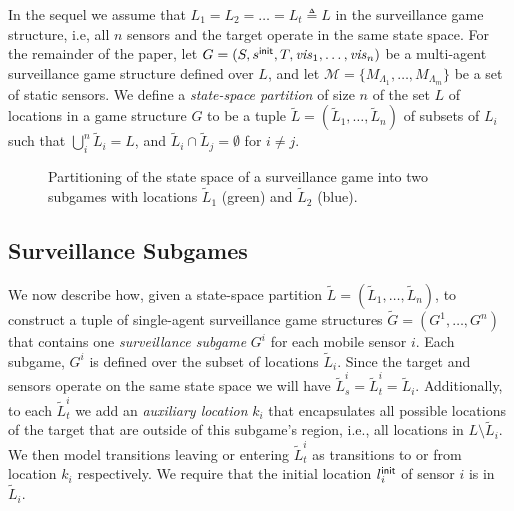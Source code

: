 In the sequel we assume that $L_1 = L_2 = \dots = L_t \triangleq L$  in the surveillance game structure, i.e, all $n$ sensors and the target operate in the same state space. For the remainder of the paper, let $G=(S,s^{\mathsf{init}},T,\mathit{vis}_1,\ldots,\mathit{vis}_n)$ be a multi-agent surveillance game structure  defined over  $L$, and let $\mathcal M = \{M_{\Lambda_1},\dots,M_{\Lambda_m}\}$ be a set of static sensors. We define a  \emph{state-space partition} of size $n$ of the set $L$ of locations in a game structure $G$ to be a tuple $\widetilde L =  (\widetilde L_1,\ldots,\widetilde L_n)$ of subsets of $L_i$ such that  $\bigcup_i^n \widetilde L_i = L $, and $\widetilde L_i \cap \widetilde L_j  = \emptyset$ for $i \neq j$. 


\begin{figure}
{}
\hspace{0.2cm}

\caption{Partitioning of the state space of a surveillance game into two subgames with locations $\widetilde{L}_1$ (green) and $\widetilde{L}_2$ (blue). }
\label{fig:simple-dist-game}
\vspace{-0.6cm}
\end{figure}

\subsection{Surveillance Subgames}
We now describe how, given a state-space partition $\widetilde L =  (\widetilde L_1,\ldots,\widetilde L_n)$, to construct a tuple of single-agent surveillance game structures $\widetilde G = (G^1,\ldots,G^n)$ that contains one  \emph{surveillance subgame} $G^i$ for each mobile sensor  $i$. Each subgame, $G^i$ is defined over the subset of locations $\widetilde{L}_i$. Since the target and sensors operate on the same state space we will have $\widetilde{L}^i_s = \widetilde{L}^i_t = \widetilde{L}_i$. Additionally, to each $\widetilde{L}^i_t$ we add an \emph{auxiliary location} $k_i$ that encapsulates all possible locations of the target that are outside of this subgame's region, i.e., all locations in $L \setminus \widetilde{L}_i$.  We then model transitions leaving or entering $\widetilde{L}^i_t$ as transitions to or from location $k_i$ respectively.
We require that the initial location $l_i^{\mathsf{init}}$ of sensor $i$ is in $\widetilde{L}_i$.

